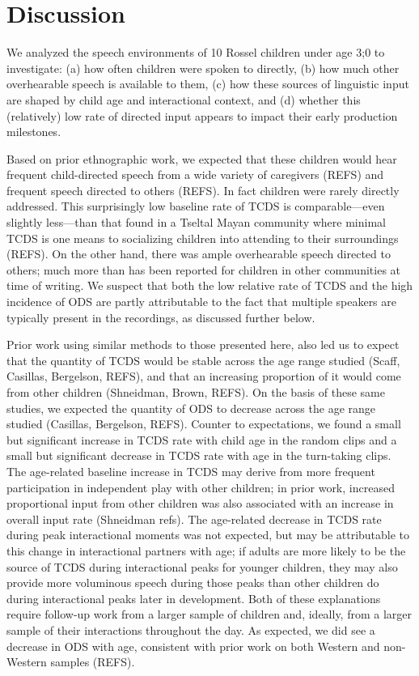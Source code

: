 \documentclass[,man,floatsintext]{apa6}
\begin{document}
\section{Discussion}\label{disc}

We analyzed the speech environments of 10 Rossel children under age 3;0
to investigate: (a) how often children were spoken to directly, (b) how
much other overhearable speech is available to them, (c) how these
sources of linguistic input are shaped by child age and interactional
context, and (d) whether this (relatively) low rate of directed input
appears to impact their early production milestones.

Based on prior ethnographic work, we expected that these children would
hear frequent child-directed speech from a wide variety of caregivers
(REFS) and frequent speech directed to others (REFS). In fact children
were rarely directly addressed. This surprisingly low baseline rate of
TCDS is comparable---even slightly less---than that found in a Tseltal
Mayan community where minimal TCDS is one means to socializing children
into attending to their surroundings (REFS). On the other hand, there
was ample overhearable speech directed to others; much more than has
been reported for children in other communities at time of writing. We
suspect that both the low relative rate of TCDS and the high incidence
of ODS are partly attributable to the fact that multiple speakers are
typically present in the recordings, as discussed further below.

Prior work using similar methods to those presented here, also led us to
expect that the quantity of TCDS would be stable across the age range
studied (Scaff, Casillas, Bergelson, REFS), and that an increasing
proportion of it would come from other children (Shneidman, Brown,
REFS). On the basis of these same studies, we expected the quantity of
ODS to decrease across the age range studied (Casillas, Bergelson,
REFS). Counter to expectations, we found a small but significant
increase in TCDS rate with child age in the random clips and a small but
significant decrease in TCDS rate with age in the turn-taking clips. The
age-related baseline increase in TCDS may derive from more frequent
participation in independent play with other children; in prior work,
increased proportional input from other children was also associated
with an increase in overall input rate (Shneidman refs). The age-related
decrease in TCDS rate during peak interactional moments was not
expected, but may be attributable to this change in interactional
partners with age; if adults are more likely to be the source of TCDS
during interactional peaks for younger children, they may also provide
more voluminous speech during those peaks than other children do during
interactional peaks later in development. Both of these explanations
require follow-up work from a larger sample of children and, ideally,
from a larger sample of their interactions throughout the day. As
expected, we did see a decrease in ODS with age, consistent with prior
work on both Western and non-Western samples (REFS).
\end{document}
